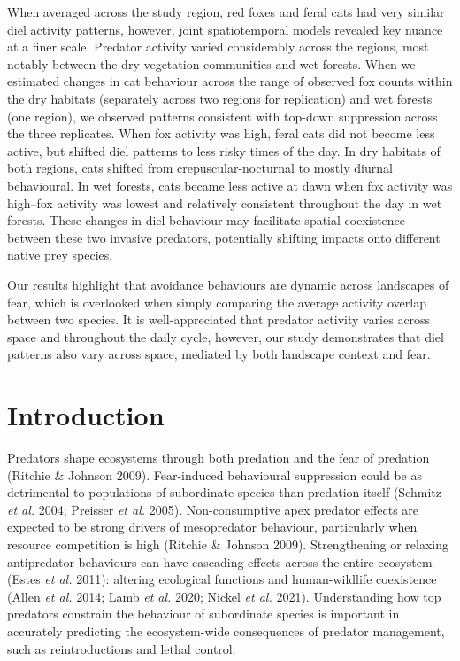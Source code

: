 \documentclass[11pt,a4paper,titlepage,twoside,openright]{style/unimelbthesis}
\begin{document}
\begin{mainmatter}
When averaged across the study region, red foxes and feral cats had very similar diel activity patterns, however, joint spatiotemporal models revealed key nuance at a finer scale. Predator activity varied considerably across the regions, most notably between the dry vegetation communities and wet forests. When we estimated changes in cat behaviour across the range of observed fox counts within the dry habitats (separately across two regions for replication) and wet forests (one region), we observed patterns consistent with top-down suppression across the three replicates. When fox activity was high, feral cats did not become less active, but shifted diel patterns to less risky times of the day. In dry habitats of both regions, cats shifted from crepuscular-nocturnal to mostly diurnal behavioural. In wet forests, cats became less active at dawn when fox activity was high--fox activity was lowest and relatively consistent throughout the day in wet forests. These changes in diel behaviour may facilitate spatial coexistence between these two invasive predators, potentially shifting impacts onto different native prey species.

Our results highlight that avoidance behaviours are dynamic across landscapes of fear, which is overlooked when simply comparing the average activity overlap between two species. It is well-appreciated that predator activity varies across space and throughout the daily cycle, however, our study demonstrates that diel patterns also vary across space, mediated by both landscape context and fear.

\newpage

\hypertarget{introduction-3}{%
\section{Introduction}\label{introduction-3}}

Predators shape ecosystems through both predation and the fear of predation (Ritchie \& Johnson 2009). Fear-induced behavioural suppression could be as detrimental to populations of subordinate species than predation itself (Schmitz \emph{et al.} 2004; Preisser \emph{et al.} 2005). Non-consumptive apex predator effects are expected to be strong drivers of mesopredator behaviour, particularly when resource competition is high (Ritchie \& Johnson 2009). Strengthening or relaxing antipredator behaviours can have cascading effects across the entire ecosystem (Estes \emph{et al.} 2011): altering ecological functions and human-wildlife coexistence (Allen \emph{et al.} 2014; Lamb \emph{et al.} 2020; Nickel \emph{et al.} 2021). Understanding how top predators constrain the behaviour of subordinate species is important in accurately predicting the ecosystem-wide consequences of predator management, such as reintroductions and lethal control.


\end{mainmatter}
\end{document}
